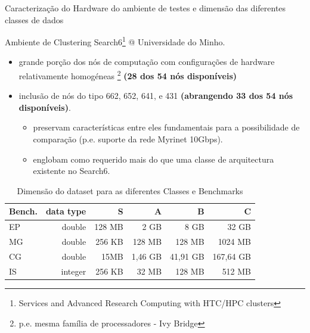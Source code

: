 \documentclass{beamer}
\begin{document}
  
\begin{frame}{Caracterização do Hardware do ambiente de testes e dimensão das diferentes classes de dados}

Ambiente de Clustering Search6\footnote{Services and Advanced Research Computing with HTC/HPC clusters} @ Universidade do Minho.

\begin{itemize}

\item grande porção dos nós de computação com configurações de hardware relativamente homogéneas \footnote{p.e. mesma família de processadores - Ivy Bridge} \textbf{(28 dos 54 nós disponíveis)}

\item inclusão de nós do tipo 662, 652, 641, e 431 \textbf{(abrangendo 33 dos 54 nós disponíveis)}.
\begin{itemize}

\item preservam características entre eles fundamentais para a possibilidade de comparação (p.e. suporte da rede Myrinet 10Gbps).

\item englobam como requerido mais do que uma classe de arquitectura existente no Search6.
 \end{itemize}

 \end{itemize}

{  \tiny

\begin{table}[h!]
\caption{Dimensão do dataset para as diferentes Classes e Benchmarks}
     \label{table:dimensaoproblema}
\centering
  \begin{tabular}{ | l | r |  r | r | r | r |  }
    \hline
    Bench. & data type & S & A & B & C \\ \hline 
    
     EP &  double & 128	MB & 2	GB	 & 8	GB	& 32	GB \\ \hline 
     
  MG &  double &   256	KB & 128	MB	& 128	MB	& 1024	MB \\ \hline 
    CG & double & 15MB & 1,46	GB& 41,91	GB	& 167,64	GB \\ \hline 
    IS & integer & 256	KB & 32	MB	& 128	MB	& 512	MB \\ \hline 

  \end{tabular}
\end{table}
}
  \end{frame}
  
\end{document}
